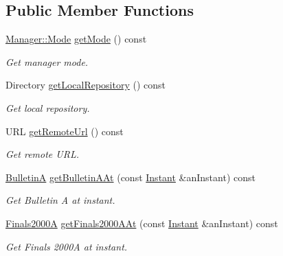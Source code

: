 \subsection*{Public Member Functions}
\begin{DoxyCompactItemize}
\item 
\hyperlink{classlibrary_1_1physics_1_1coord_1_1frame_1_1provider_1_1iers_1_1_manager_a84f44554ac04c5e18ed7ff448debf392}{Manager\+::\+Mode} \hyperlink{classlibrary_1_1physics_1_1coord_1_1frame_1_1provider_1_1iers_1_1_manager_ad8be4c49c8ecf722ac33eda1b56bc0bf}{get\+Mode} () const
\begin{DoxyCompactList}\small\item\em Get manager mode. \end{DoxyCompactList}\item 
Directory \hyperlink{classlibrary_1_1physics_1_1coord_1_1frame_1_1provider_1_1iers_1_1_manager_a80dc3aab9fbe0e36b522bd44349ca1d8}{get\+Local\+Repository} () const
\begin{DoxyCompactList}\small\item\em Get local repository. \end{DoxyCompactList}\item 
U\+RL \hyperlink{classlibrary_1_1physics_1_1coord_1_1frame_1_1provider_1_1iers_1_1_manager_a306dc26605d2c314fcfc8a89e76d4f65}{get\+Remote\+Url} () const
\begin{DoxyCompactList}\small\item\em Get remote U\+RL. \end{DoxyCompactList}\item 
\hyperlink{classlibrary_1_1physics_1_1coord_1_1frame_1_1provider_1_1iers_1_1_bulletin_a}{BulletinA} \hyperlink{classlibrary_1_1physics_1_1coord_1_1frame_1_1provider_1_1iers_1_1_manager_ab6d7d7f3bdbf9d982a8507aa2455d6ca}{get\+Bulletin\+A\+At} (const \hyperlink{classlibrary_1_1physics_1_1time_1_1_instant}{Instant} \&an\+Instant) const
\begin{DoxyCompactList}\small\item\em Get Bulletin A at instant. \end{DoxyCompactList}\item 
\hyperlink{classlibrary_1_1physics_1_1coord_1_1frame_1_1provider_1_1iers_1_1_finals2000_a}{Finals2000A} \hyperlink{classlibrary_1_1physics_1_1coord_1_1frame_1_1provider_1_1iers_1_1_manager_a7e419906c184e80e78b1538c929b9fc1}{get\+Finals2000\+A\+At} (const \hyperlink{classlibrary_1_1physics_1_1time_1_1_instant}{Instant} \&an\+Instant) const
\begin{DoxyCompactList}\small\item\em Get Finals 2000A at instant. \end{DoxyCompactList}\item 

\end{DoxyCompactItemize}
